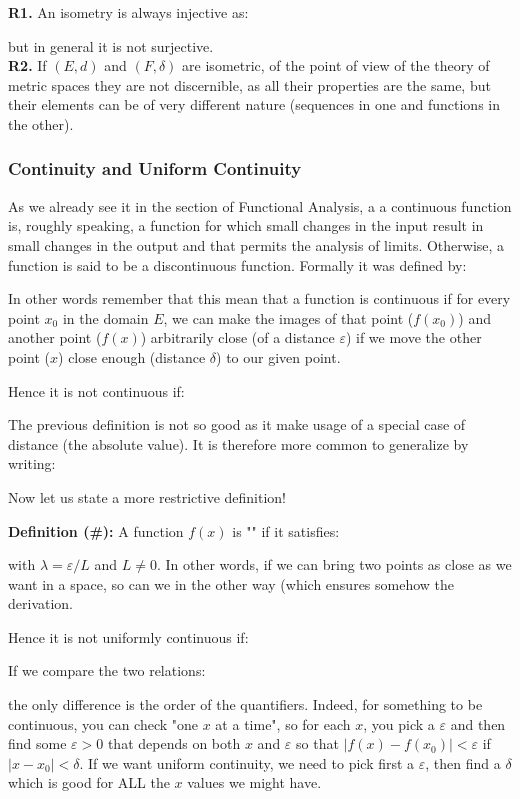 	\begin{tcolorbox}[title=Remarks,colframe=black,arc=10pt]
	\textbf{R1.} An isometry is always injective as:
	
	but in general it is not surjective.\\
	
	\textbf{R2.} If $(E,d)$ and $(F,\delta)$ are isometric, of the point of view of the theory of metric spaces they are not discernible, as all their properties are the same, but their elements can be  of very different nature (sequences in one and functions in the other).\\
	\end{tcolorbox}
	
	\pagebreak
	\subsubsection{Continuity and Uniform Continuity}
	As we already see it in the section of Functional Analysis, a a continuous function is, roughly speaking, a function for which small changes in the input result in small changes in the output and that permits the analysis of limits. Otherwise, a function is said to be a discontinuous function. Formally it was defined by:
	
	In other words remember that this mean that a function is continuous if for every point $x_0$ in the domain $E$, we can make the images of that point ($f(x_0)$) and another point ($f(x)$) arbitrarily close (of a distance $\varepsilon$) if we move the other point ($x$) close enough (distance $\delta$) to our given point.
	
	Hence it is not continuous if:
	
	
	The previous definition is not so good as it make usage of a special case of distance (the absolute value). It is therefore more common to generalize by writing:
	
	
	Now let us state a more restrictive definition!
	
	\textbf{Definition (\#\mydef):} A function $f(x)$ is "" if it satisfies:
	
	with $\lambda=\varepsilon/L$ and $L\neq 0$. In other words, if we can bring two points as close as we want in a space, so can we in the other way (which ensures somehow the derivation.
	
	Hence it is not uniformly continuous if:
	
	
	If we compare the two relations:
	
	the only difference is the order of the quantifiers. Indeed, for something to be continuous, you can check "one $x$ at a time", so for each $x$, you pick a $\varepsilon$ and then find some $\varepsilon>0$ that depends on both $x$ and $\varepsilon$ so that $|f(x)-f(x_0)|<\varepsilon$ if $|x-x_0|<\delta$. If we want uniform continuity, we need to pick first a $\varepsilon$, then find a $\delta$ which is good for ALL the $x$ values we might have.
	
